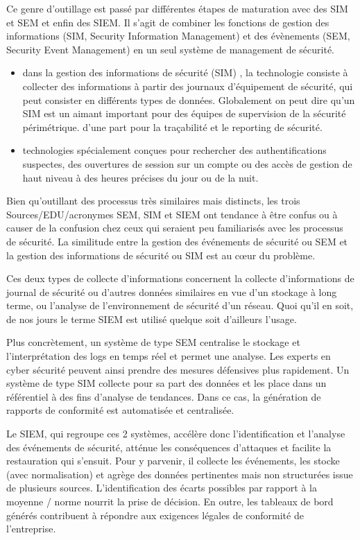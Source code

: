  Ce genre d'outillage est passé par différentes étapes de maturation avec des SIM et SEM  et enfin des SIEM.
Il s’agit de combiner les fonctions de gestion des informations (SIM, Security Information Management) et des évènements  (SEM, Security Event Management) en un seul système de management de sécurité.

\begin{itemize}

	\item dans la gestion des informations de sécurité (SIM) , la technologie consiste  à collecter des informations à partir des journaux d'équipement de sécurité, qui peut consister en différents types de données. Globalement on peut dire qu'un SIM est un aimant important pour des équipes de supervision de la sécurité périmétrique. d'une part pour la traçabilité et le reporting de sécurité.
	\item technologies spécialement conçues pour rechercher des authentifications suspectes, des ouvertures de session sur un compte ou des accès de gestion de haut niveau à des heures précises du jour ou de la nuit.
\end{itemize}

Bien qu'outillant des processus très similaires mais distincts, les trois Sources/EDU/acronymes SEM, SIM et SIEM ont tendance à être confus ou à causer de la confusion chez ceux qui seraient peu familiarisés avec les processus de sécurité.
La similitude entre la gestion des événements de sécurité ou SEM et la gestion des informations de sécurité ou SIM est au cœur du problème.

Ces deux types de collecte d'informations concernent la collecte d'informations de journal de sécurité ou d'autres données similaires en vue d'un stockage à long terme, ou l'analyse de l'environnement de sécurité d'un réseau. Quoi qu'il en soit, de nos jours le terme SIEM est utilisé quelque soit d'ailleurs l'usage.


Plus concrètement, un système de type SEM centralise le stockage et l’interprétation des logs en temps réel et permet une analyse. Les experts en cyber sécurité peuvent ainsi prendre des mesures défensives plus rapidement. Un système de type SIM collecte pour sa part des données et les place dans un référentiel à des fins d’analyse de tendances. Dans ce cas, la génération de rapports de conformité est automatisée et centralisée.

Le SIEM, qui regroupe ces 2 systèmes, accélère donc l’identification et l’analyse des événements de sécurité, atténue les conséquences d’attaques et facilite la restauration qui s’ensuit. Pour y parvenir, il collecte les événements, les stocke (avec normalisation) et agrège des données pertinentes mais non structurées issue de plusieurs sources. L’identification des écarts possibles par rapport à la moyenne / norme nourrit la prise de décision. En outre, les tableaux de bord générés contribuent à répondre aux exigences légales de conformité de l’entreprise.

